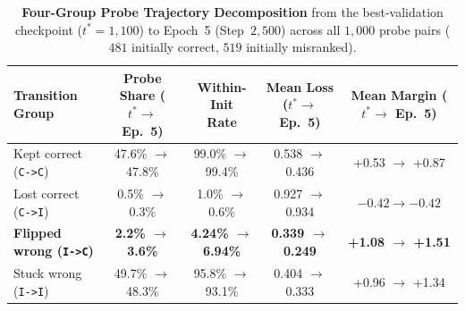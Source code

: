 \documentclass[11pt]{article}
\theoremstyle{plain}
\theoremstyle{definition}
\begin{document}
\begin{table}[t]
  \centering
  \caption{\textbf{Four-Group Probe Trajectory Decomposition} from the best-validation checkpoint ($t^* = 1{,}100$) to Epoch~5 (Step~$2{,}500$) across all $1{,}000$ probe pairs ($481$ initially correct, $519$ initially misranked).}
  \label{tab:gpt2_four_groups}
  \footnotesize
  \renewcommand{\arraystretch}{1.16}
  \setlength{\tabcolsep}{3pt}
  \begin{tabular*}{\textwidth}{@{\extracolsep{\fill}}lcccc@{}}
    \toprule
    \textbf{Transition Group} & \shortstack{\textbf{Probe Share}\\\textbf{($t^* \to$ Ep.\ 5)}} & \shortstack{\textbf{Within-Init}\\\textbf{Rate}} & \shortstack{\textbf{Mean Loss}\\\textbf{($t^* \to$ Ep.\ 5)}} & \shortstack{\textbf{Mean Margin}\\\textbf{($t^* \to$ Ep.\ 5)}} \\
    \midrule
    Kept correct (\texttt{C->C}) & 47.6\% $\to$ 47.8\% & 99.0\% $\to$ 99.4\% & 0.538 $\to$ 0.436 & +0.53 $\to$ +0.87 \\
    Lost correct (\texttt{C->I}) & 0.5\% $\to$ 0.3\% & 1.0\% $\to$ 0.6\% & 0.927 $\to$ 0.934 & $-0.42 \to -0.42$ \\
    \textbf{Flipped wrong (\texttt{I->C})} & \textbf{2.2\% $\to$ 3.6\%} & \textbf{4.24\% $\to$ 6.94\%} & \textbf{0.339 $\to$ 0.249} & \textbf{+1.08 $\to$ +1.51} \\
    Stuck wrong (\texttt{I->I}) & 49.7\% $\to$ 48.3\% & 95.8\% $\to$ 93.1\% & 0.404 $\to$ 0.333 & +0.96 $\to$ +1.34 \\
    \bottomrule
  \end{tabular*}
\end{table}
\end{document}
